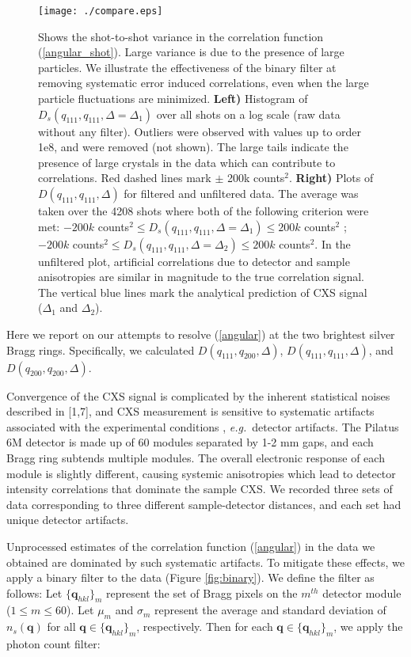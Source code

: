 \documentclass [11pt,fleqn]{article}
\begin{document}
\begin{figure}
\begin{center}
\texttt{[image: ./compare.eps]}
\end{center}
\caption{ Shows the shot-to-shot variance in the correlation function (\ref{angular_shot}). Large variance is due to the presence of large particles. We illustrate the effectiveness of the binary filter at removing systematic error induced correlations, even when the large particle fluctuations are minimized. {\bf Left)} Histogram of $D_s(q_{111}, q_{111}, \Delta = \Delta_1)$ over all shots on a log scale (raw data without any filter). Outliers were observed with values up to order 1e8, and were removed (not shown). The large tails indicate the presence of large crystals in the data which can contribute to correlations. Red dashed lines mark $\pm$ 200k counts$^2$. {\bf Right)} Plots of $D(q_{111}, q_{111}, \Delta)$ for filtered and unfiltered data. The average was taken over the 4208 shots where both of the following criterion were met: $-200k $ counts$^2 \le D_s(q_{111}, q_{111}, \Delta = \Delta_1) \le 200k$ counts$^2$ ; $-200k $ counts$^2 \le D_s(q_{111}, q_{111}, \Delta = \Delta_2) \le 200k$ counts$^2$. In the unfiltered plot, artificial correlations due to detector and sample anisotropies are similar in magnitude to the true correlation signal. The vertical blue lines mark the analytical prediction of CXS signal ($\Delta_1$ and $\Delta_2$).}
\label{fig:compare}
\end{figure}

Here we report on our attempts to resolve (\ref{angular}) at the two brightest silver Bragg rings. Specifically, we calculated $D (q_{111},q_{200}, \Delta  )$, $D (q_{111},q_{111}, \Delta  )$, and $D (q_{200},q_{200}, \Delta  )$. 

Convergence of the CXS signal is complicated by the inherent statistical noises described in [1,7], and CXS measurement is sensitive to systematic artifacts associated with the experimental conditions \cite{Kam:1981ua}, \textit{e.g.}~detector artifacts. The Pilatus 6M detector is made up of 60 modules separated by 1-2 mm gaps, and each Bragg ring subtends multiple modules. The overall electronic response of each module is slightly different, causing systemic anisotropies which lead to detector intensity correlations that dominate the sample CXS. We recorded three sets of data corresponding to three different sample-detector distances, and each set had unique detector artifacts. 

Unprocessed estimates of the correlation function (\ref{angular}) in the data we obtained are dominated by such systematic artifacts. To mitigate these effects, we apply a binary filter to the data (Figure \ref{fig:binary}). We define the filter as follows: Let $\{ \bm q_{hkl} \}_{m}$ represent the set of Bragg pixels on the $m^{th}$ detector module ($1 \leq m \leq 60$). Let $\mu_m$ and $\sigma_m$ represent the average and standard deviation of $n_{s}(\bm q)$  for all $\bm q \in \{ \bm q_{hkl} \}_{m} $, respectively. Then for each $\bm q \in \{ \bm q_{hkl} \}_{m} $, we apply the photon count filter:
\end{document}
